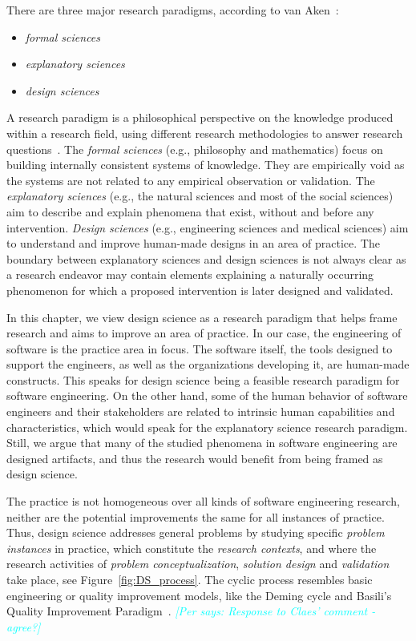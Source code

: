 \documentclass[graybox]{svmult}
\newcommand{\per}[1]{\textcolor{cyan}{{\it [Per says: #1]}}}
\newcommand{\per}[1]{}
\begin{document}
There are three major research paradigms, according to van Aken~\cite{van_aken_management_2004}:
\begin{itemize}
\item \emph{formal sciences} %
\item \emph{explanatory sciences} %
\item \emph{design sciences}%
\end{itemize}

A research paradigm is a philosophical perspective on the knowledge produced within a research field, using different research methodologies to answer research questions~\cite{van_aken_management_2004}. 
The \emph{formal sciences} (e.g., philosophy and mathematics) focus on building internally consistent systems of knowledge. They are empirically void as the systems are not related to any empirical observation or validation. The \emph{explanatory sciences} (e.g., the natural sciences and most of the social sciences) aim to describe and explain phenomena that exist, without and before any intervention. \emph{Design sciences} (e.g., engineering sciences and medical sciences) aim to understand and improve human-made designs in an area of practice. The boundary between explanatory sciences and design sciences is not always clear as a research endeavor may contain elements explaining a naturally occurring phenomenon for which a proposed intervention is later designed and validated. 

In this chapter, we view design science as a research paradigm that helps frame research and aims to improve an area of practice. In our case, the engineering of software is the practice area in focus. The software itself, the tools designed to support the engineers, as well as the organizations developing it, are human-made constructs. This speaks for design science being a feasible research paradigm for software engineering. On the other hand, some of the human behavior of software engineers and their stakeholders are related to intrinsic human capabilities and characteristics, which would speak for the explanatory science research paradigm. Still, we argue that many of the studied phenomena in software engineering are designed artifacts, and thus the research would benefit from being framed as design science.

The practice is not homogeneous over all kinds of software engineering research, neither are the potential improvements the same for all instances of practice. Thus, design science addresses general problems by studying specific \emph{problem instances} in practice, which constitute the \emph{research contexts}, and where the research activities of \emph{problem conceptualization}, \emph{solution design} and \emph{validation} take place, see Figure~\ref{fig:DS_process}. 
The cyclic process resembles basic engineering or quality improvement models, like the Deming cycle \cite{Deming1986} and Basili's Quality Improvement Paradigm~\cite{Basili92}. \per{Response to Claes' comment - agree?}
\end{document}
